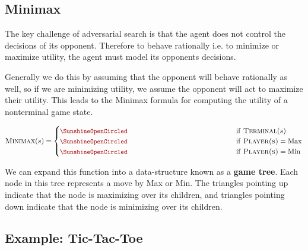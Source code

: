 \documentclass[11pt]{article}
\begin{document}
\subsection{Minimax}

The key challenge of adversarial search is that the agent does not control the decisions of its opponent. Therefore to behave rationally i.e. to minimize or maximize utility, the agent must model its opponents decisions. 

Generally we do this by assuming that the opponent will behave rationally as well, so if we are minimizing utility, we assume the opponent will act to maximize their utility. This leads to the Minimax formula for computing the utility of a nonterminal game state.

\[ \msc{Minimax}(s) = \begin{cases} 
  \censorm{\msc{Utility}(s)} & \mathrm{if\ } \msc{Terminal}(s)  \\
  \censorm{\max_{a \in \msc{Act}(s)}  \msc{Minimax}(\msc{Res}(s, a))} & \mathrm{if\ } \msc{Player(s)} = \mathrm{Max}  \\
  \censorm{\min_{a \in \msc{Act}(s) } \msc{Minimax}(\msc{Res}(s, a))} & \mathrm{if\ } \msc{Player(s)} = \mathrm{Min} \end{cases}\] 

We can expand this function into a data-structure known as a \textbf{game tree}. Each node in this tree represents a move by Max or Min. The triangles pointing up indicate that the node is maximizing over its children, and triangles pointing down indicate that the node is minimizing over its children.

\begin{center}
\end{center}



\subsection{Example: Tic-Tac-Toe}
\end{document}
